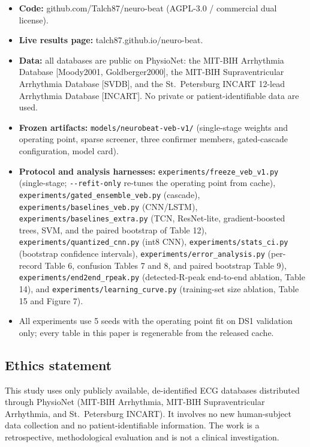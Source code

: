 \documentclass[
]{article}
\providecommand{\tightlist}{%
  \setlength{\itemsep}{0pt}\setlength{\parskip}{0pt}}
\begin{document}
\begin{itemize}
\tightlist
\item
  \textbf{Code:} github.com/Talch87/neuro-beat (AGPL-3.0 / commercial
  dual license).
\item
  \textbf{Live results page:} talch87.github.io/neuro-beat.
\item
  \textbf{Data:} all databases are public on PhysioNet: the MIT-BIH
  Arrhythmia Database {[}Moody2001, Goldberger2000{]}, the MIT-BIH
  Supraventricular Arrhythmia Database {[}SVDB{]}, and the
  St.~Petersburg INCART 12-lead Arrhythmia Database {[}INCART{]}. No
  private or patient-identifiable data are used.
\item
  \textbf{Frozen artifacts:} \texttt{models/neurobeat-veb-v1/}
  (single-stage weights and operating point, sparse screener, three
  confirmer members, gated-cascade configuration, model card).
\item
  \textbf{Protocol and analysis harnesses:}
  \texttt{experiments/freeze\_veb\_v1.py} (single-stage;
  \texttt{-\/-refit-only} re-tunes the operating point from cache),
  \texttt{experiments/gated\_ensemble\_veb.py} (cascade),
  \texttt{experiments/baselines\_veb.py} (CNN/LSTM),
  \texttt{experiments/baselines\_extra.py} (TCN, ResNet-lite,
  gradient-boosted trees, SVM, and the paired bootstrap of Table 12),
  \texttt{experiments/quantized\_cnn.py} (int8 CNN),
  \texttt{experiments/stats\_ci.py} (bootstrap confidence intervals),
  \texttt{experiments/error\_analysis.py} (per-record Table 6, confusion
  Tables 7 and 8, and paired bootstrap Table 9),
  \texttt{experiments/end2end\_rpeak.py} (detected-R-peak end-to-end
  ablation, Table 14), and \texttt{experiments/learning\_curve.py}
  (training-set size ablation, Table 15 and Figure 7).
\item
  All experiments use 5 seeds with the operating point fit on DS1
  validation only; every table in this paper is regenerable from the
  released cache.
\end{itemize}

\subsection{Ethics statement}\label{ethics-statement}

This study uses only publicly available, de-identified ECG databases
distributed through PhysioNet (MIT-BIH Arrhythmia, MIT-BIH
Supraventricular Arrhythmia, and St.~Petersburg INCART). It involves no
new human-subject data collection and no patient-identifiable
information. The work is a retrospective, methodological evaluation and
is not a clinical investigation.
\end{document}
